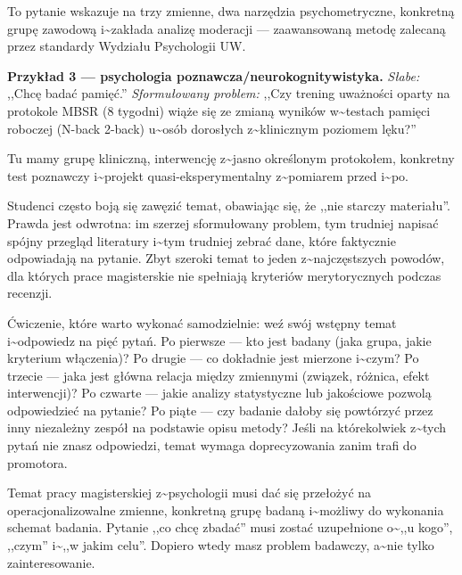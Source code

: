 \documentclass[12pt,a4paper,twoside,openany]{book}
\begin{document}
To pytanie wskazuje na trzy zmienne, dwa narzędzia psychometryczne, konkretną grupę zawodową i\textasciitilde{}zakłada analizę moderacji --- zaawansowaną metodę zalecaną przez standardy Wydziału Psychologii UW.


\textbf{Przykład 3 --- psychologia poznawcza/neurokognitywistyka.} \textit{Słabe:} ,,Chcę badać pamięć.'' \textit{Sformułowany problem:} ,,Czy trening uważności oparty na protokole MBSR (8 tygodni) wiąże się ze zmianą wyników w\textasciitilde{}testach pamięci roboczej (N-back 2-back) u\textasciitilde{}osób dorosłych z\textasciitilde{}klinicznym poziomem lęku?''


Tu mamy grupę kliniczną, interwencję z\textasciitilde{}jasno określonym protokołem, konkretny test poznawczy i\textasciitilde{}projekt quasi-eksperymentalny z\textasciitilde{}pomiarem przed i\textasciitilde{}po.


\begin{warningbox} Studenci często boją się zawęzić temat, obawiając się, że ,,nie starczy materiału''. Prawda jest odwrotna: im szerzej sformułowany problem, tym trudniej napisać spójny przegląd literatury i\textasciitilde{}tym trudniej zebrać dane, które faktycznie odpowiadają na pytanie. Zbyt szeroki temat to jeden z\textasciitilde{}najczęstszych powodów, dla których prace magisterskie nie spełniają kryteriów merytorycznych podczas recenzji.
\end{warningbox}


Ćwiczenie, które warto wykonać samodzielnie: weź swój wstępny temat i\textasciitilde{}odpowiedz na pięć pytań. Po pierwsze --- kto jest badany (jaka grupa, jakie kryterium włączenia)? Po drugie --- co dokładnie jest mierzone i\textasciitilde{}czym? Po trzecie --- jaka jest główna relacja między zmiennymi (związek, różnica, efekt interwencji)? Po czwarte --- jakie analizy statystyczne lub jakościowe pozwolą odpowiedzieć na pytanie? Po piąte --- czy badanie dałoby się powtórzyć przez inny niezależny zespół na podstawie opisu metody? Jeśli na którekolwiek z\textasciitilde{}tych pytań nie znasz odpowiedzi, temat wymaga doprecyzowania zanim trafi do promotora.


\begin{keyinsight} Temat pracy magisterskiej z\textasciitilde{}psychologii musi dać się przełożyć na operacjonalizowalne zmienne, konkretną grupę badaną i\textasciitilde{}możliwy do wykonania schemat badania. Pytanie ,,co chcę zbadać'' musi zostać uzupełnione o\textasciitilde{},,u kogo'', ,,czym'' i\textasciitilde{},,w jakim celu''. Dopiero wtedy masz problem badawczy, a\textasciitilde{}nie tylko zainteresowanie.
\end{keyinsight}
\end{document}
